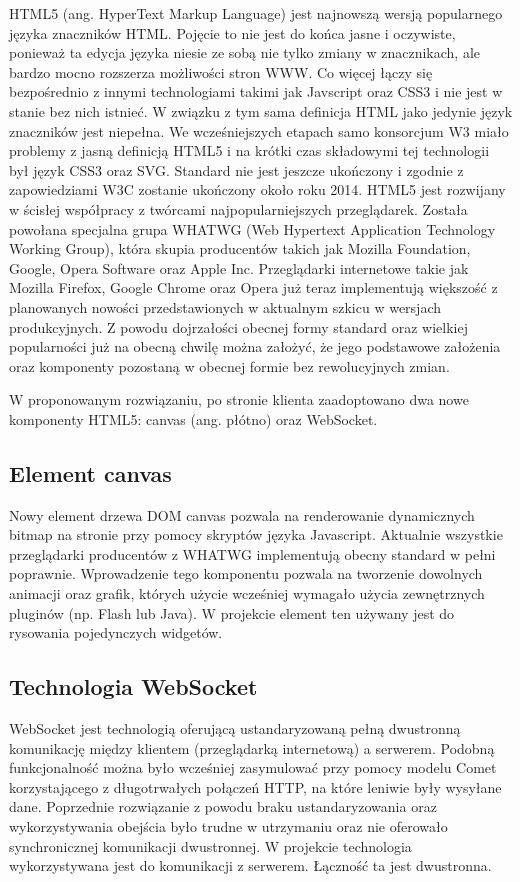 HTML5 (ang. HyperText Markup Language) jest najnowszą wersją popularnego języka znaczników HTML. Pojęcie to nie jest do końca jasne i oczywiste, ponieważ ta edycja języka niesie ze sobą nie tylko zmiany w znacznikach, ale bardzo mocno rozszerza możliwości stron WWW. Co więcej łączy się bezpośrednio z innymi technologiami takimi jak Javscript oraz CSS3 i nie jest w stanie bez nich istnieć. W związku z tym sama definicja HTML jako jedynie język znaczników jest niepełna. We wcześniejszych etapach samo konsorcjum W3 miało problemy z jasną definicją HTML5 i na krótki czas składowymi tej technologii był język CSS3 oraz SVG.
Standard nie jest jeszcze ukończony i zgodnie z zapowiedziami W3C zostanie ukończony około roku 2014.
HTML5 jest rozwijany w ścisłej współpracy z twórcami najpopularniejszych przeglądarek. Została powołana specjalna grupa WHATWG (Web Hypertext Application Technology Working Group), która skupia producentów takich jak Mozilla Foundation, Google, Opera Software oraz Apple Inc. Przeglądarki internetowe takie jak Mozilla Firefox, Google Chrome oraz Opera już teraz implementują większość z planowanych nowości przedstawionych w aktualnym szkicu w wersjach produkcyjnych. Z powodu dojrzałości obecnej formy standard oraz wielkiej popularności już na obecną chwilę można założyć, że jego podstawowe założenia oraz komponenty pozostaną w obecnej formie bez rewolucyjnych zmian.

W proponowanym rozwiązaniu, po stronie klienta zaadoptowano dwa nowe komponenty HTML5: canvas (ang. płótno) oraz WebSocket.

\subsection{Element canvas}
Nowy element drzewa DOM canvas pozwala na renderowanie dynamicznych bitmap na stronie przy pomocy skryptów języka Javascript. Aktualnie wszystkie przeglądarki producentów z WHATWG implementują obecny standard w pełni poprawnie.
 Wprowadzenie tego komponentu pozwala na tworzenie dowolnych animacji oraz grafik, których użycie wcześniej wymagało użycia zewnętrznych pluginów (np. Flash lub Java).
W projekcie element ten używany jest do rysowania pojedynczych widgetów. 

\subsection{Technologia WebSocket}
WebSocket jest technologią oferującą ustandaryzowaną pełną dwustronną komunikację między klientem (przeglądarką internetową) a serwerem. Podobną funkcjonalność można było wcześniej zasymulować przy pomocy modelu Comet korzystającego z długotrwałych połączeń HTTP, na które leniwie były wysyłane dane. Poprzednie rozwiązanie z powodu braku ustandaryzowania oraz wykorzystywania obejścia było trudne w utrzymaniu oraz nie oferowało synchronicznej komunikacji dwustronnej.
W projekcie technologia wykorzystywana jest do komunikacji z serwerem. Łączność ta jest dwustronna.
